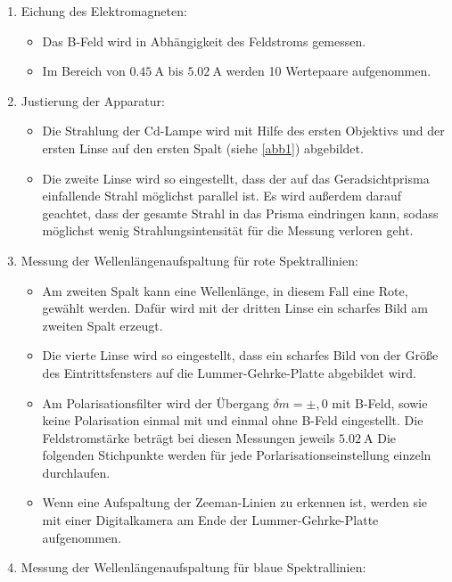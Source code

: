 \begin{enumerate}
    \item Eichung des Elektromagneten:
    \begin{itemize}
        \item Das B-Feld wird in Abhängigkeit des Feldstroms gemessen.
        \item Im Bereich von $\SI{0,45}{\ampere}$ bis $\SI{5,02}{\ampere}$
        werden 10 Wertepaare aufgenommen.
    \end{itemize}
    \item Justierung der Apparatur:
    \begin{itemize}
        \item Die Strahlung der Cd-Lampe wird mit Hilfe des ersten 
        Objektivs und der ersten Linse auf den ersten Spalt (siehe \ref{abb1})
        abgebildet.
        \item Die zweite Linse wird so eingestellt, dass der auf das Geradsichtprisma
        einfallende Strahl möglichst parallel ist. Es wird außerdem darauf geachtet, dass der 
        gesamte Strahl in das Prisma eindringen kann, sodass möglichst wenig 
        Strahlungsintensität für die Messung verloren geht.
    \end{itemize}
    \item Messung der Wellenlängenaufspaltung für rote Spektrallinien:
    \begin{itemize}
        \item Am zweiten Spalt kann eine Wellenlänge, in diesem Fall eine Rote,
        gewählt werden. Dafür wird mit der dritten Linse ein scharfes Bild am 
        zweiten Spalt erzeugt.
        \item Die vierte Linse wird so eingestellt, dass ein scharfes Bild von der Größe des 
        Eintrittsfensters auf die Lummer-Gehrke-Platte abgebildet wird.
        \item Am Polarisationsfilter wird der Übergang $\delta m= \pm,0$ mit B-Feld, sowie keine 
        Polarisation einmal mit und einmal ohne B-Feld eingestellt.
        Die Feldstromstärke beträgt bei diesen Messungen jeweils $\SI{5,02}{\ampere}$
        Die folgenden Stichpunkte werden für jede Porlarisationseinstellung einzeln durchlaufen.
        \item Wenn eine Aufspaltung der Zeeman-Linien zu erkennen ist, 
        werden sie mit einer Digitalkamera am Ende der Lummer-Gehrke-Platte
        aufgenommen.
    \end{itemize}
    \newpage
    \item Messung der Wellenlängenaufspaltung für blaue Spektrallinien:

\end{enumerate}
